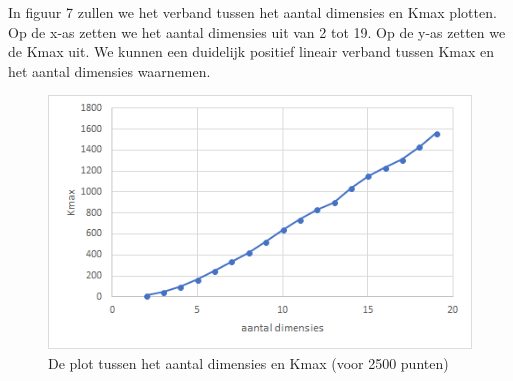 \documentclass[12pt]{article}
\begin{document}
In figuur 7 zullen we het verband tussen het aantal dimensies en Kmax plotten.
Op de x-as zetten we het aantal dimensies uit van 2 tot 19.
Op de y-as zetten we de Kmax uit.
We kunnen een duidelijk positief lineair verband tussen Kmax en het aantal dimensies waarnemen.

\begin{figure}
\includegraphics[width=\textwidth]{dim-Kmax.png}
\caption{De plot tussen het aantal dimensies en Kmax (voor 2500 punten)}
\end{figure}
\end{document}
